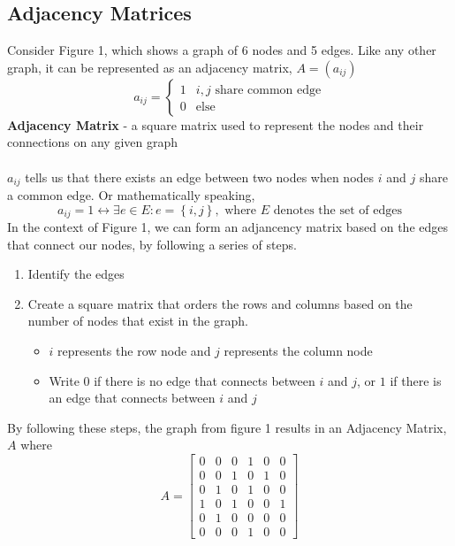 \subsection{Adjacency Matrices}
Consider Figure 1, which shows a graph of 6 nodes and 5 edges. Like any other graph, it can be represented as an adjacency matrix, $A = (a_{ij})$ 
\[
  a_{ij} = \begin{cases} 
    1 & i, j \text{ share common edge} \\
    0 & \text{else}
  \end{cases}
\]
\textbf{Adjacency Matrix} - a square matrix used to represent the nodes 
and their connections on any given graph\\\\
$a_{ij}$ tells us that there exists an edge between two nodes when nodes $i$ and $j$ 
share a common edge. Or mathematically speaking, 
\[
  a_{ij} = 1 \leftrightarrow \exists e \in E : e = \left\{i, j\right\}, 
  \text{ where $E$ denotes the set of edges}
\]
\newpage 
In the context of Figure 1, we can form an adjancency matrix based on the edges that 
connect our nodes, by following a series of steps. 
\begin{enumerate}
  \item Identify the edges 
  \item Create a square matrix that orders the rows and columns based on the number of 
    nodes that exist in the graph. 
  \begin{itemize}
    \item $i$ represents the row node and $j$ represents the column node
    \item Write $0$ if there is no edge that connects between $i$ and $j$, or $1$ 
      if there is an edge that connects between $i$ and $j$ 
  \end{itemize}
\end{enumerate}
By following these steps, the graph from figure 1 results in an Adjacency Matrix, $A$
where 
\[
  A = \begin{bmatrix}
    0 & 0 & 0 & 1 & 0 & 0 \\
    0 & 0 & 1 & 0 & 1 & 0 \\
    0 & 1 & 0 & 1 & 0 & 0 \\
    1 & 0 & 1 & 0 & 0 & 1 \\
    0 & 1 & 0 & 0 & 0 & 0 \\
    0 & 0 & 0 & 1 & 0 & 0 
  \end{bmatrix}
\]
